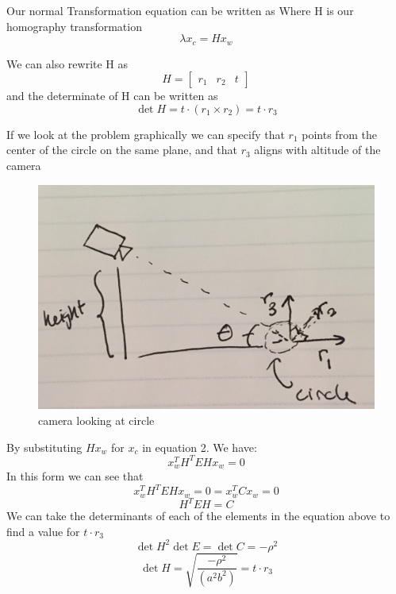 \documentclass[11pt,english]{article}
\begin{document}
\begin{enumerate}
Our normal Transformation equation can be written as 
Where H is our homography transformation
 \begin{equation}
 \lambda x_c = H x_w 
 \end{equation}
 
 We can also rewrite H as 
 $$ H = \begin{bmatrix}
 r_1& r_2 & t 
 \end{bmatrix}
 $$ 
 and the determinate of H can be written as 
 \begin{equation}
 \det{H} = t\cdot (r_1 \times r_2) = t \cdot r_3 
 \end{equation}
 
 If we look at the problem graphically we can specify that  $ r_1$ points from the center of the circle on the same plane, and that $r_3$ aligns with altitude of the camera 
 \begin{figure}[h!]
  \includegraphics[width = \linewidth]{camera}
\caption{camera looking at circle}
 \end{figure}
 
 By substituting $ H x_w$ for $x_c$ in equation 2. We have:  
 \begin{equation}
 x_w^T H^T E H x_w = 0 
 \end{equation} 
 In this form we can see that  
 $$  x_w^T H^T E H x_w = 0   = x_w^T C x_w = 0 $$ 
 $$ H^T E H = C $$ 
We can take the determinants of each of the elements in the equation above to find a value for $t \cdot r_3  $ 
$$
\det H^2 \det E = \det C = - \rho^2   
$$
\begin{equation}
\det H = \sqrt{\frac{-\rho^2 }{ (a^2b^2)}} = t \cdot r_3 
\end{equation} 


\end{enumerate}
\end{document}
